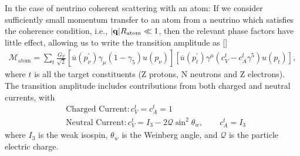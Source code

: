 In the case of neutrino coherent scattering with an atom: If we consider sufficiently small momentum transfer to an atom from a neutrino which satisfies the coherence condition, i.e., $|\bold{q}|R_{\mathrm{atom}}\ll1$, then the relevant phase factors have little effect, allowing us to write the transition amplitude as [\cite{Nicolescu:2013rxa}]
\begin{align}
\label{M_atom}
\mathcal{M}_\mathrm{atom}=\sum_t\frac{G_F}{\sqrt{2}}\left[\overline{u}(p^\prime_\nu)\gamma_\mu\left(1-\gamma_5\right)u(p_\nu)\right]\left[\overline{u}(p^\prime_t)\gamma^\mu\left(c^t_V-c^t_A\gamma^5\right)u(p_t)\right],
\end{align}
where $t$ is all the target constituents (Z protons, N neutrons and Z electrons). The transition amplitude includes contributions from both charged and neutral currents, with
\begin{align}\label{CC_int}
&\mathrm{Charged\,\,Current}: c^t_V=c^t_A=1\\
\label{NC_int}
&\mathrm{Neutral\,\, Current}: c^t_V=I_3-2\mathcal{Q}\sin^2\theta_w,\qquad c^t_A=I_3
\end{align}
where $I_3$ is the weak isospin, $\theta_w$ is the Weinberg angle, and $\mathcal{Q}$ is the particle electric charge. 

